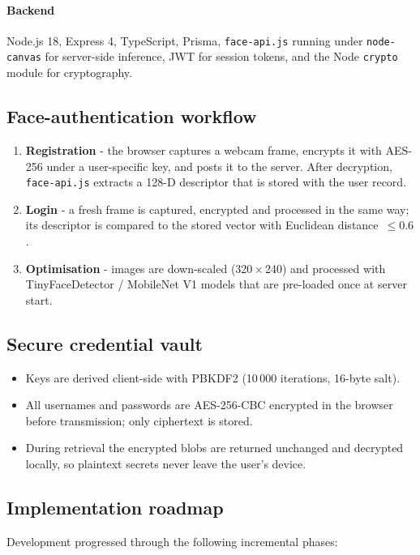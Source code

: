 \paragraph{Backend}
Node.js 18, Express 4, TypeScript, Prisma, \texttt{face-api.js} running under \texttt{node-canvas} for server-side inference, JWT for session tokens, and the Node \texttt{crypto} module for cryptography.

\subsection{Face-authentication workflow}
\begin{enumerate}
  \item \textbf{Registration} - the browser captures a webcam frame, encrypts it with AES-256 under a user-specific key, and posts it to the server. After decryption, \texttt{face-api.js} extracts a 128-D descriptor that is stored with the user record.
  \item \textbf{Login} - a fresh frame is captured, encrypted and processed in the same way; its descriptor is compared to the stored vector with Euclidean distance~$\le0.6$.
  \item \textbf{Optimisation} - images are down-scaled (320\,$\times$\,240) and processed with TinyFaceDetector / MobileNet V1 models that are pre-loaded once at server start.
\end{enumerate}

\subsection{Secure credential vault}
\begin{itemize}
  \item Keys are derived client-side with PBKDF2 (10\,000 iterations, 16-byte salt).  
  \item All usernames and passwords are AES-256-CBC encrypted in the browser before transmission; only ciphertext is stored.  
  \item During retrieval the encrypted blobs are returned unchanged and decrypted locally, so plaintext secrets never leave the user's device.  
\end{itemize}

\subsection{Implementation roadmap}
Development progressed through the following incremental phases:


